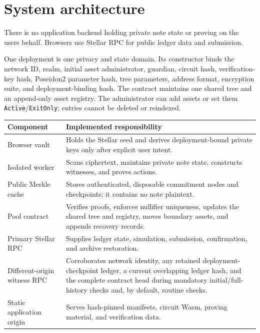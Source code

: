 \documentclass[11pt,letterpaper]{article}
\begin{document}
\section{System architecture}\label{system-architecture}

There is no application backend holding private note state or proving on
the user\textquotesingle s behalf. Browsers use Stellar RPC for public
ledger data and submission.

One deployment is one privacy and state domain. Its constructor binds
the network ID, realm, initial asset administrator, guardian, circuit
hash, verification-key hash, Poseidon2 parameter hash, tree parameters,
address format, encryption suite, and deployment-binding hash. The
contract maintains one shared tree and an append-only asset registry.
The administrator can add assets or set them
\texttt{Active}/\texttt{ExitOnly}; entries cannot be deleted or
reindexed.

{\def\LTcaptype{none} %
\begin{longtable}[]{@{}
  >{\raggedright\arraybackslash}p{}
  >{\raggedright\arraybackslash}p{}@{}}
\toprule\noalign{}
\begin{minipage}[b]{\linewidth}\raggedright
Component
\end{minipage} & \begin{minipage}[b]{\linewidth}\raggedright
Implemented responsibility
\end{minipage} \\
\midrule\noalign{}
\endhead
\bottomrule\noalign{}
\endlastfoot
Browser vault & Holds the Stellar seed and derives deployment-bound
private keys only after explicit user intent. \\
Isolated worker & Scans ciphertext, maintains private note state,
constructs witnesses, and proves actions. \\
Public Merkle cache & Stores authenticated, disposable commitment nodes
and checkpoints; it contains no note plaintext. \\
Pool contract & Verifies proofs, enforces nullifier uniqueness, updates
the shared tree and registry, moves boundary assets, and appends
recovery records. \\
Primary Stellar RPC & Supplies ledger state, simulation, submission,
confirmation, and archive restoration. \\
Different-origin witness RPC & Corroborates network identity, any
retained deployment-checkpoint ledger, a current overlapping ledger
hash, and the complete contract head during mandatory
initial/\allowbreak{}full-history checks and, by default, routine
checks. \\
Static application origin & Serves hash-pinned manifests, circuit Wasm,
proving material, and verification data. \\
\end{longtable}
}
\end{document}
